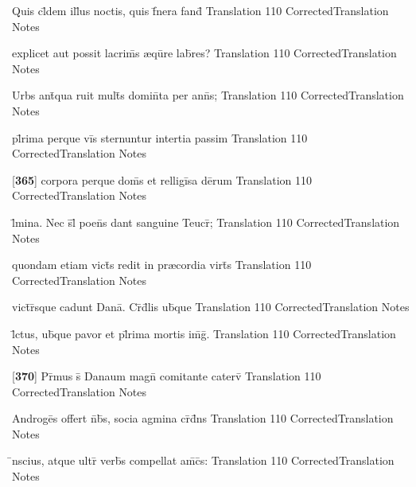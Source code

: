 \latline
  {Quis cl\={}dem ill\={\macron {\i}}us noctis, quis f\={}nera fand\={}}
  { Translation }
  {110}
  { CorrectedTranslation }
  { Notes }


\latline
  {explicet aut possit lacrim\={\macron {\i}}s {\ae}qu\={}re lab\={}res?}
  { Translation }
  {110}
  { CorrectedTranslation }
  { Notes }


\latline
  {Urbs ant\={\macron {\i}}qua ruit mult\={}s domin\={}ta per ann\={}s;}
  { Translation }
  {110}
  { CorrectedTranslation }
  { Notes }


\latline
  {pl\={}rima perque vi\={}s sternuntur intertia passim}
  { Translation }
  {110}
  { CorrectedTranslation }
  { Notes }


\latline
  {[\textbf{365}] corpora perque dom\={}s et relligi\={}sa de\={}rum}
  { Translation }
  {110}
  { CorrectedTranslation }
  { Notes }


\latline
  {l\={\macron {\i}}mina.  Nec s\={}l\={\macron {\i}} poen\={}s dant sanguine Teucr\={\macron {\i}};}
  { Translation }
  {110}
  { CorrectedTranslation }
  { Notes }


\latline
  {quondam etiam vict\={\macron {\i}}s redit in pr{\ae}cordia virt\={}s}
  { Translation }
  {110}
  { CorrectedTranslation }
  { Notes }


\latline
  {vict\={}r\={}sque cadunt Dana\={\macron {\i}}.  Cr\={}d\={}lis ub\={\macron {\i}}que}
  { Translation }
  {110}
  { CorrectedTranslation }
  { Notes }


\latline
  {l\={}ctus, ub\={\macron {\i}}que pavor et pl\={}rima mortis im\={}g\={}.}
  { Translation }
  {110}
  { CorrectedTranslation }
  { Notes }


\latline
  {[\textbf{370}] Pr\={\macron {\i}}mus s\={} Danaum magn\={} comitante caterv\={}}
  { Translation }
  {110}
  { CorrectedTranslation }
  { Notes }


\latline
  {Androge\={}s offert n\={}b\={\macron {\i}}s, socia agmina cr\={}d\={}ns}
  { Translation }
  {110}
  { CorrectedTranslation }
  { Notes }


\latline
  {\={\macron {\i}}nscius, atque ultr\={} verb\={\macron {\i}}s compellat am\={\macron {\i}}c\={\macron {\i}}s:}
  { Translation }
  {110}
  { CorrectedTranslation }
  { Notes }


